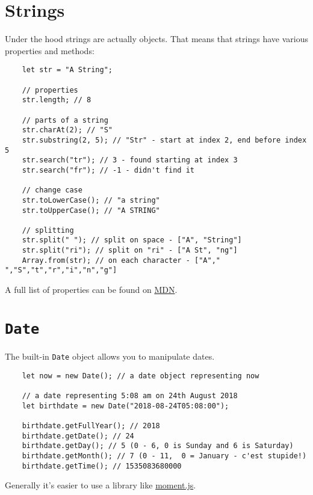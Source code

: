 \section{Strings}

Under the hood strings are actually objects. That means that strings have various properties and methods:

\begin{verbatim}
    let str = "A String";

    // properties
    str.length; // 8

    // parts of a string
    str.charAt(2); // "S"
    str.substring(2, 5); // "Str" - start at index 2, end before index 5
    str.search("tr"); // 3 - found starting at index 3
    str.search("fr"); // -1 - didn't find it

    // change case
    str.toLowerCase(); // "a string"
    str.toUpperCase(); // "A STRING"

    // splitting
    str.split(" "); // split on space - ["A", "String"]
    str.split("ri"); // split on "ri" - ["A St", "ng"]
    Array.from(str); // on each character - ["A"," ","S","t","r","i","n","g"]
\end{verbatim}

A full list of properties can be found on \href{https://developer.mozilla.org/en-US/docs/Web/JavaScript/Reference/Global_Objects/String}{MDN}.

\pagebreak

\section{\texttt{Date}}

The built-in \texttt{Date} object allows you to manipulate dates.

\begin{verbatim}
    let now = new Date(); // a date object representing now

    // a date representing 5:08 am on 24th August 2018
    let birthdate = new Date("2018-08-24T05:08:00");

    birthdate.getFullYear(); // 2018
    birthdate.getDate(); // 24
    birthdate.getDay(); // 5 (0 - 6, 0 is Sunday and 6 is Saturday)
    birthdate.getMonth(); // 7 (0 - 11,  0 = January - c'est stupide!)
    birthdate.getTime(); // 1535083680000
\end{verbatim}

Generally it's easier to use a library like \href{http://momentjs.com}{moment.js}.


